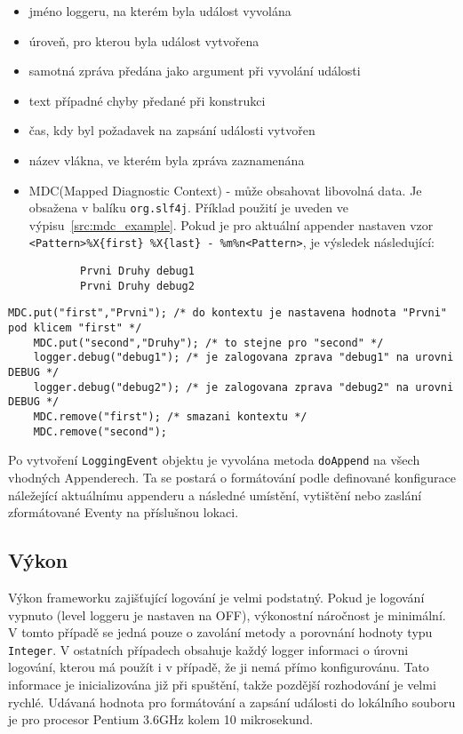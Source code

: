 \documentclass[ing,male,java,dept460]{diploma}		%
\begin{document}
\begin{itemize}
\item  jméno loggeru, na kterém byla událost vyvolána
\item úroveň, pro kterou byla událost vytvořena
\item samotná zpráva předána jako argument při vyvolání události
\item text případné chyby předané při konstrukci
\item čas, kdy byl požadavek na zapsání události vytvořen
\item název vlákna, ve kterém byla zpráva zaznamenána
\item MDC(Mapped Diagnostic Context) - může obsahovat libovolná data. Je obsažena v balíku \texttt{org.slf4j}. Příklad použití je uveden ve výpisu~\ref{src:mdc_example}. Pokud je pro aktuální appender nastaven vzor \texttt{ \textless Pattern\textgreater\%X\{first\} \%X\{last\} - \%m\%n\textless Pattern\textgreater}, je výsledek následující: 
	\begin{verbatim}
		Prvni Druhy debug1
		Prvni Druhy debug2
	\end{verbatim}
\end{itemize}
\begin{lstlisting}[label=src:mdc_example,caption=Ukázka použití MDC]
	MDC.put("first","Prvni"); /* do kontextu je nastavena hodnota "Prvni" pod klicem "first" */
	MDC.put("second","Druhy"); /* to stejne pro "second" */
	logger.debug("debug1"); /* je zalogovana zprava "debug1" na urovni DEBUG */
	logger.debug("debug2"); /* je zalogovana zprava "debug2" na urovni DEBUG */
	MDC.remove("first"); /* smazani kontextu */
	MDC.remove("second");
\end{lstlisting}

\par Po vytvoření \texttt{LoggingEvent} objektu je vyvolána metoda \texttt{doAppend} na všech vhodných Appenderech. Ta se postará o formátování podle definované konfigurace náležející aktuálnímu appenderu a následné umístění, vytištění nebo zaslání zformátované Eventy na příslušnou lokaci. 


\subsection{Výkon}
\par Výkon frameworku zajišťující logování je velmi podstatný. Pokud je logování vypnuto (level loggeru je nastaven na OFF), výkonostní náročnost je minimální. V tomto případě se jedná pouze o zavolání metody a porovnání hodnoty typu \texttt{Integer}. V ostatních případech obsahuje každý logger informaci o úrovni logování, kterou má použít i v případě, že ji nemá přímo konfigurovánu. Tato informace je inicializována již při spuštění, takže pozdější rozhodování je velmi rychlé. Udávaná hodnota pro formátování a zapsání události do lokálního souboru je pro procesor Pentium 3.6GHz kolem 10 mikrosekund\cite{logbackArchitecture}.
\end{document}

